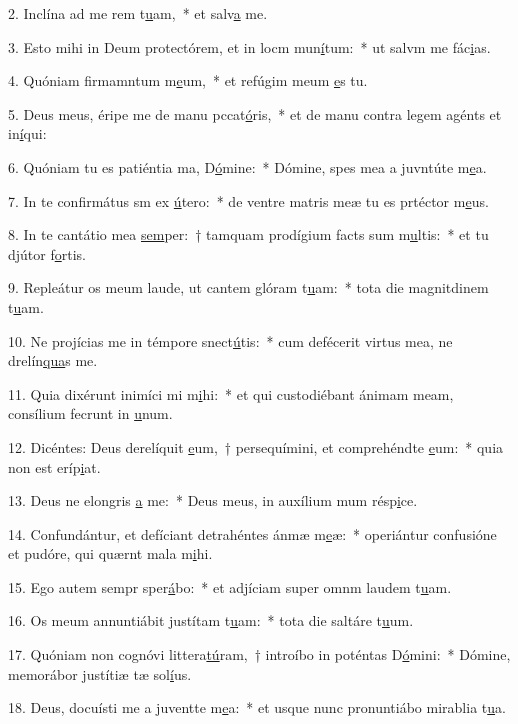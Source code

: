 2. Inclína ad me rem t\uline{u}am,~* et salv\uline{a} me.\par 
3. Esto mihi in Deum protectórem, et in locm mun\uline{í}tum:~* ut salvm me fác\uline{i}as.\par 
4. Quóniam firmamntum m\uline{e}um,~* et refúgim meum \uline{e}s tu.\par 
5. Deus meus, éripe me de manu pccat\uline{ó}ris,~* et de manu contra legem agénts et in\uline{í}qui:\par 
6. Quóniam tu es patiéntia ma, D\uline{ó}mine:~* Dómine, spes mea a juvntúte m\uline{e}a.\par 
7. In te confirmátus sm ex \uline{ú}tero:~* de ventre matris meæ tu es prtéctor m\uline{e}us.\par 
8. In te cantátio mea \uline{sem}per:~† tamquam prodígium facts sum m\uline{u}ltis:~* et tu djútor f\uline{o}rtis.\par 
9. Repleátur os meum laude, ut cantem glóram t\uline{u}am:~* tota die magnitdinem t\uline{u}am.\par 
10. Ne projícias me in témpore snect\uline{ú}tis:~* cum defécerit virtus mea, ne drelín\uline{qua}s me.\par 
11. Quia dixérunt inimíci mi m\uline{i}hi:~* et qui custodiébant ánimam meam, consílium fecrunt in \uline{u}num.\par 
12. Dicéntes: Deus derelíquit \uline{e}um,~† persequímini, et comprehéndte \uline{e}um:~* quia non est  eríp\uline{i}at.\par 
13. Deus ne elongris \uline{a} me:~* Deus meus, in auxílium mum résp\uline{i}ce.\par 
14. Confundántur, et defíciant detrahéntes ánmæ m\uline{e}æ:~* operiántur confusióne et pudóre, qui quærnt mala m\uline{i}hi.\par 
15. Ego autem sempr sper\uline{á}bo:~* et adjíciam super omnm laudem t\uline{u}am.\par 
16. Os meum annuntiábit justítam t\uline{u}am:~* tota die saltáre t\uline{u}um.\par 
17. Quóniam non cognóvi littera\uline{tú}ram,~† introíbo in poténtas D\uline{ó}mini:~* Dómine, memorábor justítiæ tæ sol\uline{í}us.\par 
18. Deus, docuísti me a juventte m\uline{e}a:~* et usque nunc pronuntiábo mirablia t\uline{u}a.\par 
